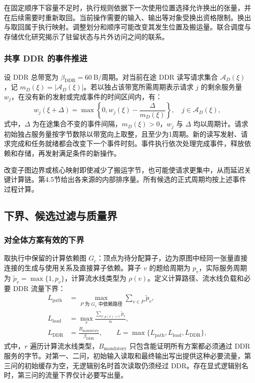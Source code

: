 在固定顺序下容量不足时，执行规则依据下一次使用位置选择允许换出的张量，并在后续需要时重新取回。当前操作需要的输入、输出等对象受换出资格限制。换出与取回属于执行映射。调整划分和顺序可能改变其发生位置及搬运量。联合调度与存储优化研究揭示了驻留状态与片外访问之间的联系\cite{A16}。

\subsubsection{共享 DDR 的事件推进}
设 DDR 总带宽为 $\beta_{\mathrm{DDR}}=60\ \mathrm B/\text{周期}$。对当前在途 DDR 读写请求集合 $\mathcal A_D(\xi)$，记 $m_D(\xi)=|\mathcal A_D(\xi)|$。若以独占该带宽所需周期表示请求 $j$ 的剩余服务量 $w_j$，在没有新的发射或完成事件的时间区间内，有：
\begin{equation}
 w_j(\xi+\Delta)=\max\left\{0,w_j(\xi)-\frac{\Delta}{m_D(\xi)}\right\},\quad j\in\mathcal A_D(\xi),
 \label{eq:bandwidth}
\end{equation}
\noindent 式中，$\Delta$ 为在途集合不变的事件间隔，$m_D(\xi)>0$，$w_j$ 与 $\Delta$ 均以周期计。请求初始独占服务量按字节数除以带宽向上取整，且至少为1周期。新的读写发射、请求完成和任务就绪都会改变下一个事件时刻。事件执行依次处理完成事件，释放依赖和存储，再发射满足条件的新操作。

改变子图边界或核心映射即使减少了搬运字节，也可能使请求更集中，从而延迟关键计算链。第4.5节给出各来源的内部排序量。所有候选的正式周期均按上述事件过程计算。

\subsection{下界、候选过滤与质量界}
\subsubsection{对全体方案有效的下界}
取执行中保留的计算依赖图 $G_c$：顶点为待分配算子，边为原图中经同一张量直接连接的生成与使用关系及直接算子依赖。算子 $v$ 的题给周期为 $p_v$，实际服务周期为 $\widetilde p_v=\max\{1,p_v\}$，计算流水线类型为 $\rho(v)$。定义计算路径、流水线负载和必要 DDR 流量下界：
\begin{align}
 L_{\mathrm{path}}&=\max_{P\text{ 为 }G_c\text{ 中依赖路径}}\sum_{v\in P}\widetilde p_v,\\
 L_{\mathrm{load}}&=\max_r\frac{\sum_{v:\rho(v)=r}\widetilde p_v}{n},\\
 L_{\mathrm{DDR}}&=\frac{B_{\mathrm{mandatory}}}{\beta_{\mathrm{DDR}}},\qquad
 L=\max\{L_{\mathrm{path}},L_{\mathrm{load}},L_{\mathrm{DDR}}\},
 \label{eq:lower}
\end{align}
\noindent 式中，$r$ 遍历计算流水线类型，$B_{\mathrm{mandatory}}$ 只包含能证明所有方案都必须通过 DDR 服务的字节。对第一、二问，初始输入读取和最终输出写出提供这种必要流量，第三问的初始缓存为空，无逻辑别名时首次读取仍须经过 DDR。存在显式逻辑别名时，第三问的流量下界仅计必要写出量。

